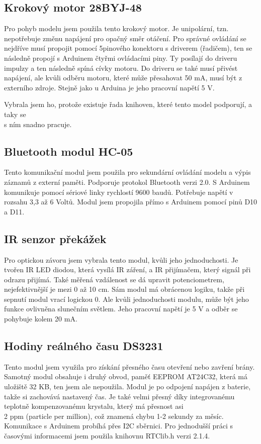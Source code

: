\documentclass[12pt, a4paper,
twoside,        %
openright
]{report}
\begin{document}
	\subsection{Krokový motor 28BYJ-48}
	Pro pohyb modelu jsem použila tento krokový motor. Je unipolární, tzn. nepotřebuje změnu napájení pro opačný směr otáčení. Pro správné ovládání se nejdříve musí propojit pomocí 5pinového konektoru s driverem (řadičem), ten se následně propojí s Arduinem čtyřmi ovládacími piny. Ty posílají do driveru impulzy a ten následně spíná cívky motoru. Do driveru se také musí přivést napájení, ale kvůli odběru motoru, které může přesahovat 50 mA, musí být z externího zdroje. Stejně jako u Arduina je jeho pracovní napětí 5 V. 
	
	Vybrala jsem ho, protože existuje řada knihoven, které tento model podporují, a taky se\\ s ním snadno pracuje.  
	
	
	\subsection{Bluetooth modul HC-05 }
	Tento komunikační modul jsem použila pro sekundární ovládání modelu a výpis záznamů z externí paměti. Podporuje protokol Bluetooth verzi 2.0. S Arduinem komunikuje pomocí sériové linky rychlostí 9600 baudů. Potřebuje napětí v rozsahu 3,3 až 6 Voltů. Modul jsem propojila přímo s Arduinem pomocí pinů D10 a D11. 
	
	\subsection{IR senzor překážek}
	Pro optickou závoru jsem vybrala tento modul, kvůli jeho jednoduchosti. Je tvořen IR LED diodou, která vysílá IR záření, a IR přijímačem, který signál při odrazu přijímá. Také měřená vzdálenost se dá upravit potenciometrem, nejefektivnější je mezi 0 až 10 cm. Sám modul má obrácenou logiku, takže při sepnutí modul vrací logickou 0. Ale kvůli jednoduchosti modulu, může být jeho funkce ovlivněna slunečním světlem. Jeho pracovní napětí je 5 V a odběr se pohybuje kolem 20 mA.  
	
	
	\subsection{Hodiny reálného času DS3231}
	Tento modul jsem využila pro získání přesného času otevření nebo zavření brány. Samotný modul obsahuje i druhý obvod, paměť EEPROM AT24C32, která má uložiště 32 KB, ten jsem ale nepoužila. Modul je po odpojení napájen z baterie, takže si zachovává nastavený čas. Je také velmi přesný díky integrovanému teplotně kompenzovanému krystalu, který má přesnost asi\\ 2 ppm (particle per million), což znamená chybu 1-2 sekundy za měsíc. Komunikace s Arduinem probíhá přes I2C sběrnici. Pro jednodušší práci s časovými informacemi jsem použila knihovnu RTClib.h verzi 2.1.4.  
	
\end{document}
